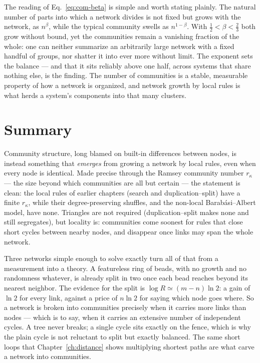 The reading of Eq.~\eqref{eq:com-beta} is simple and worth stating plainly. The
natural number of parts into which a network divides is not fixed but grows with
the network, as $n^{\beta}$, while the typical community swells as $n^{1-\beta}$.
With $\tfrac12<\beta<\tfrac23$ both grow without bound, yet the communities remain
a vanishing fraction of the whole: one can neither summarize an arbitrarily large
network with a fixed handful of groups, nor shatter it into ever more without
limit. The exponent sets the balance --- and that it sits reliably above one half,
across systems that share nothing else, is the finding. The number of communities
is a stable, measurable property of how a network is organized, and network growth
by local rules is what herds a system's components into that many clusters.

\section{Summary}

Community structure, long blamed on built-in differences between nodes, is
instead something that \emph{emerges} from growing a network by local rules, even
when every node is identical. Made precise through the Ramsey community number
$r_\kappa$ --- the size beyond which communities are all but certain --- the
statement is clean: the local rules of earlier chapters (search and
duplication--split) have a finite $r_\kappa$, while their
degree-preserving shuffles, and the non-local Barab\'asi--Albert model, have none.
Triangles are not required (duplication--split makes none and still segregates),
but locality is: communities come soonest for rules that close short cycles
between nearby nodes, and disappear once links may span the whole network.

Three networks simple enough to solve exactly turn all of that from a measurement
into a theory. A featureless ring of beads, with no growth and no randomness
whatever, is already split in two once each bead reaches beyond its nearest
neighbor. The evidence for the split is $\log R\simeq(m-n)\ln 2$: a
gain of $\ln 2$ for every link, against a price of $n\ln 2$ for saying which node
goes where. So a network is broken into communities precisely when it carries more
links than nodes --- which is to say, when it carries an extensive number of
independent cycles. A tree never breaks; a single cycle sits exactly on the fence,
which is why the plain cycle is not reluctant to split but exactly balanced. The
same short loops that Chapter~\ref{ch:distance} shows multiplying shortest paths
are what carve a network into communities.

